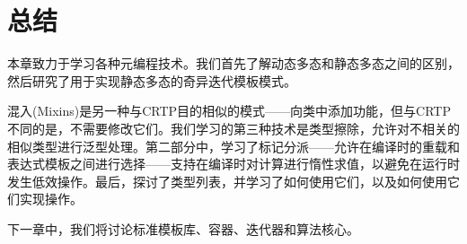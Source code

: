 \section{总结}
本章致力于学习各种元编程技术。我们首先了解动态多态和静态多态之间的区别，然后研究了用于实现静态多态的奇异迭代模板模式。

混入(Mixins)是另一种与CRTP目的相似的模式——向类中添加功能，但与CRTP不同的是，不需要修改它们。我们学习的第三种技术是类型擦除，允许对不相关的相似类型进行泛型处理。第二部分中，学习了标记分派——允许在编译时的重载和表达式模板之间进行选择——支持在编译时对计算进行惰性求值，以避免在运行时发生低效操作。最后，探讨了类型列表，并学习了如何使用它们，以及如何使用它们实现操作。

下一章中，我们将讨论标准模板库、容器、迭代器和算法核心。